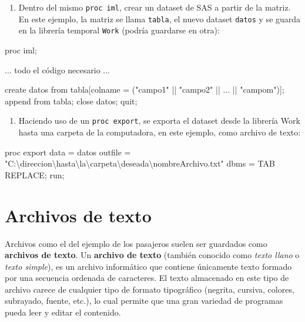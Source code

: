 \documentclass[
]{book}
\newenvironment{Shaded}{\begin{snugshade}}{\end{snugshade}}
\newcommand{\NormalTok}[1]{#1}
\providecommand{\tightlist}{%
  \setlength{\itemsep}{0pt}\setlength{\parskip}{0pt}}
\begin{document}
\begin{enumerate}
\def\labelenumi{\arabic{enumi}.}
\tightlist
\item
  Dentro del mismo \texttt{proc\ iml}, crear un dataset de SAS a partir de la matriz. En este ejemplo, la matriz se llama \texttt{tabla}, el nuevo dataset \texttt{datos} y se guarda en la librería temporal \texttt{Work} (podría guardarse en otra):
\end{enumerate}

\begin{Shaded}
\begin{Highlighting}[]
\NormalTok{proc iml;}
    
\NormalTok{    ... todo el código necesario ...}

\NormalTok{    create datos from tabla[colname = ("campo1" || "campo2" || ... || "campom")];}
\NormalTok{    append from tabla;}
\NormalTok{    close datos;}
\NormalTok{quit;}
\end{Highlighting}
\end{Shaded}

\begin{enumerate}
\def\labelenumi{\arabic{enumi}.}
\setcounter{enumi}{1}
\tightlist
\item
  Haciendo uso de un \texttt{proc\ export}, se exporta el dataset desde la librería Work hasta una carpeta de la computadora, en este ejemplo, como archivo de texto:
\end{enumerate}

\begin{Shaded}
\begin{Highlighting}[]
\NormalTok{proc export data = datos}
\NormalTok{            outfile = "C:\textbackslash{}direccion\textbackslash{}hasta\textbackslash{}la\textbackslash{}carpeta\textbackslash{}deseada\textbackslash{}nombreArchivo.txt" }
\NormalTok{            dbms = TAB REPLACE;}
\NormalTok{run;}
\end{Highlighting}
\end{Shaded}

\hypertarget{archivos-de-texto}{%
\section{Archivos de texto}\label{archivos-de-texto}}

Archivos como el del ejemplo de los pasajeros suelen ser guardados como \textbf{archivos de texto}. Un \textbf{archivo de texto} (también conocido como \emph{texto llano} o \emph{texto simple}), es un archivo informático que contiene únicamente texto formado por una secuencia ordenada de caracteres. El texto almacenado en este tipo de archivo carece de cualquier tipo de formato tipográfico (negrita, cursiva, colores, subrayado, fuente, etc.), lo cual permite que una gran variedad de programas pueda leer y editar el contenido.
\end{document}
